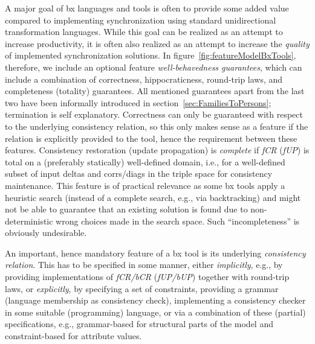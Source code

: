 A major goal of bx languages and tools is often to provide some added value compared to implementing synchronization using standard unidirectional transformation languages.
While this goal can be realized as an attempt to increase productivity, it is often also realized as an attempt to increase the \emph{quality} of implemented synchronization solutions.
In figure~\ref{fig:featureModelBxTools}, therefore, we include an optional feature \emph{well-behavedness guarantees}, which can include a combination of correctness, hippocraticness, round-trip laws, and completeness (totality) guarantees.
All mentioned guarantees apart from the last two have been informally introduced in section~\ref{sec:FamiliesToPersons}; termination is self explanatory.
Correctness can only be guaranteed with respect to the underlying consistency relation, so this only makes sense as a feature if the relation is explicitly provided to the tool, hence the requirement between these features. 
Consistency restoration (update propagation) is \emph{complete} if \emph{fCR} (\emph{fUP}) is total on a  (preferably statically) well-defined domain, i.e., for a well-defined subset of input deltas and corrs/diags in the triple space for consistency maintenance.
This feature is of practical relevance as some bx tools apply a heuristic search (instead of a complete search, e.g., via backtracking) and might not be able to guarantee that an existing solution is found due to non-deterministic wrong choices made in the search space.
Such ``incompleteness'' is obviously undesirable.

An important, hence mandatory feature of a bx tool is its underlying \emph{consistency relation}.
This has to be specified in some manner, either \emph{implicitly}, e.g., by providing implementations of \emph{fCR/bCR} (\emph{fUP/bUP}) together with round-trip laws, or \emph{explicitly}, by specifying a set of constraints, providing a grammar (language membership as consistency check), implementing a consistency checker in some suitable (programming) language, or via a combination of these (partial) specifications, e.g., grammar-based for structural parts of the model and constraint-based for attribute values.

